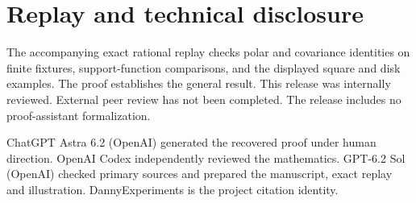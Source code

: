 \documentclass[11pt,a4paper]{amsart}
\begin{document}
\section*{Replay and technical disclosure}
The accompanying exact rational replay checks polar and covariance identities on finite fixtures, support-function comparisons, and the displayed square and disk examples. The proof establishes the general result. This release was internally reviewed. External peer review has not been completed. The release includes no proof-assistant formalization.

ChatGPT Astra 6.2 (OpenAI) generated the recovered proof under human direction. OpenAI Codex independently reviewed the mathematics. GPT-6.2 Sol (OpenAI) checked primary sources and prepared the manuscript, exact replay and illustration. DannyExperiments is the project citation identity.



\end{document}
